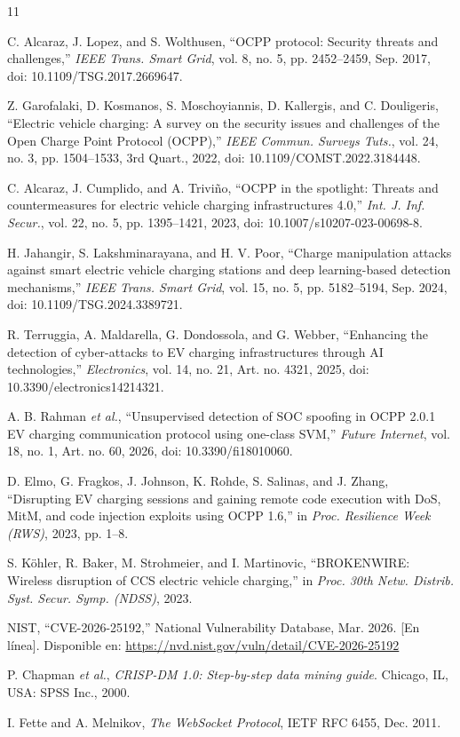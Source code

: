 \documentclass[conference]{IEEEtran}
\begin{document}
\FloatBarrier
\begin{thebibliography}{11}

C. Alcaraz, J. Lopez, and S. Wolthusen, ``OCPP protocol: Security threats and challenges,'' \textit{IEEE Trans. Smart Grid}, vol. 8, no. 5, pp. 2452--2459, Sep. 2017, doi: 10.1109/TSG.2017.2669647.

Z. Garofalaki, D. Kosmanos, S. Moschoyiannis, D. Kallergis, and C. Douligeris, ``Electric vehicle charging: A survey on the security issues and challenges of the Open Charge Point Protocol (OCPP),'' \textit{IEEE Commun. Surveys Tuts.}, vol. 24, no. 3, pp. 1504--1533, 3rd Quart., 2022, doi: 10.1109/COMST.2022.3184448.

C. Alcaraz, J. Cumplido, and A. Triviño, ``OCPP in the spotlight: Threats and countermeasures for electric vehicle charging infrastructures 4.0,'' \textit{Int. J. Inf. Secur.}, vol. 22, no. 5, pp. 1395--1421, 2023, doi: 10.1007/s10207-023-00698-8.

H. Jahangir, S. Lakshminarayana, and H. V. Poor, ``Charge manipulation attacks against smart electric vehicle charging stations and deep learning-based detection mechanisms,'' \textit{IEEE Trans. Smart Grid}, vol. 15, no. 5, pp. 5182--5194, Sep. 2024, doi: 10.1109/TSG.2024.3389721.

R. Terruggia, A. Maldarella, G. Dondossola, and G. Webber, ``Enhancing the detection of cyber-attacks to EV charging infrastructures through AI technologies,'' \textit{Electronics}, vol. 14, no. 21, Art. no. 4321, 2025, doi: 10.3390/electronics14214321.

A. B. Rahman \textit{et al.}, ``Unsupervised detection of SOC spoofing in OCPP 2.0.1 EV charging communication protocol using one-class SVM,'' \textit{Future Internet}, vol. 18, no. 1, Art. no. 60, 2026, doi: 10.3390/fi18010060.

D. Elmo, G. Fragkos, J. Johnson, K. Rohde, S. Salinas, and J. Zhang, ``Disrupting EV charging sessions and gaining remote code execution with DoS, MitM, and code injection exploits using OCPP 1.6,'' in \textit{Proc. Resilience Week (RWS)}, 2023, pp. 1--8.

S. Köhler, R. Baker, M. Strohmeier, and I. Martinovic, ``BROKENWIRE: Wireless disruption of CCS electric vehicle charging,'' in \textit{Proc. 30th Netw. Distrib. Syst. Secur. Symp. (NDSS)}, 2023.

NIST, ``CVE-2026-25192,'' National Vulnerability Database, Mar. 2026. [En línea]. Disponible en: \url{https://nvd.nist.gov/vuln/detail/CVE-2026-25192}

P. Chapman \textit{et al.}, \textit{CRISP-DM 1.0: Step-by-step data mining guide}. Chicago, IL, USA: SPSS Inc., 2000.

I. Fette and A. Melnikov, \textit{The WebSocket Protocol}, IETF RFC 6455, Dec. 2011.

\end{thebibliography}
\end{document}
